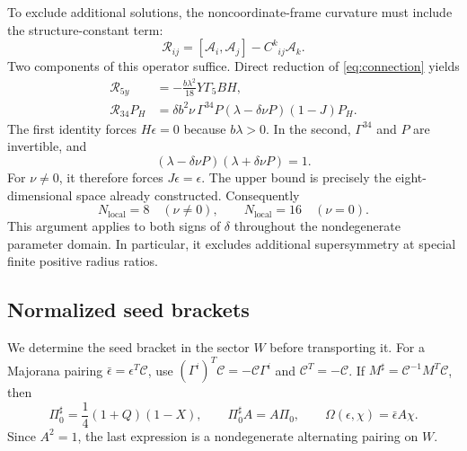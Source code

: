 To exclude additional solutions, the noncoordinate-frame curvature must include the structure-constant term:
\begin{equation}\label{susy:curvature-definition}
 \mathcal R_{ij}=[\mathcal A_i,\mathcal A_j]-C^k{}_{ij}\mathcal A_k.
\end{equation}
Two components of this operator suffice. Direct reduction of \eqref{eq:connection} yields
\begin{align}
 \mathcal R_{5y}&=-\frac{b\lambda^2}{18}Y\Gamma_5BH,
 \label{susy:upper-H}\\
 \mathcal R_{34}P_H&=
 \delta b^2\nu\,\Gamma^{34}P(\lambda-\delta\nu P)(1-J)P_H.
 \label{susy:upper-J}
\end{align}
The first identity forces $H\epsilon=0$ because $b\lambda>0$. In the second, $\Gamma^{34}$ and $P$ are invertible, and
\begin{equation}\label{susy:invertible}
 (\lambda-\delta\nu P)(\lambda+\delta\nu P)=1.
\end{equation}
For $\nu\ne0$, it therefore forces $J\epsilon=\epsilon$. The upper bound is precisely the eight-dimensional space already constructed. Consequently
\begin{equation}\label{susy:count}
 N_{\mathrm{local}}=8\quad(\nu\ne0),\qquad
 N_{\mathrm{local}}=16\quad(\nu=0).
\end{equation}
This argument applies to both signs of $\delta$ throughout the nondegenerate parameter domain. In particular, it excludes additional supersymmetry at special finite positive radius ratios.

\subsection{Normalized seed brackets}

We determine the seed bracket in the sector $W$ before transporting it. For a Majorana pairing $\bar\epsilon=\epsilon^T\mathcal C$, use
$(\Gamma^i)^T\mathcal C=-\mathcal C\Gamma^i$ and $\mathcal C^T=-\mathcal C$. If $M^\sharp=\mathcal C^{-1}M^T\mathcal C$, then
\begin{equation}\label{susy:pairing}
 \Pi_0^\sharp=\frac14(1+Q)(1-X),\qquad
 \Pi_0^\sharp A=A\Pi_0,\qquad
 \Omega(\epsilon,\chi)=\bar\epsilon A\chi.
\end{equation}
Since $A^2=1$, the last expression is a nondegenerate alternating pairing on $W$.

